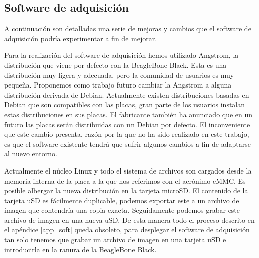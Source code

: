 	\subsection{Software de adquisición}
		A continuación son detalladas una serie de mejoras y cambios que el software de adquisición podría experimentar a fin de mejorar.
		\begin{description}[style=unboxed,leftmargin=0cm,labelwidth=1cm]
			\item[Debian]
				Para la realización del software de adquisición hemos utilizado Angstrom, la distribución que viene por defecto con la
				BeagleBone Black. Esta es una distribución muy ligera y adecuada, pero la comunidad de usuarios es muy pequeña.
				Proponemos como trabajo futuro cambiar la Angstrom a alguna distribución derivada de Debian. Actualmente existen
				distribuciones basadas en Debian que son compatibles con las placas, gran parte de los usuarios instalan estas
				distribuciones en sus placas. El fabricante también ha anunciado que en un futuro las placas serán distribuidas con un
				Debian por defecto. El inconveniente que este cambio presenta, razón por la que no ha sido realizado en este trabajo,
				es que el software existente tendrá que sufrir algunos cambios a fin de adaptarse al nuevo entorno.
				\par
				Actualmente el núcleo Linux y todo el sistema de archivos son cargados desde la memoria interna de la placa a la que
				nos referimos con el acrónimo eMMC. Es posible albergar la nueva distribución en la tarjeta microSD. El contenido de
				la tarjeta uSD es fácilmente duplicable, podemos exportar este a un archivo de imagen que contendría una copia exacta.
				Seguidamente podemos grabar este archivo de imagen en una nueva uSD. De esta manera todo el proceso descrito en el
				apéndice \ref{app_soft} queda obsoleto, para desplegar el software de adquisición  tan solo tenemos que grabar un
				archivo de imagen en una tarjeta uSD e introducirla en la ranura de la BeagleBone Black. 
		\end{description}
